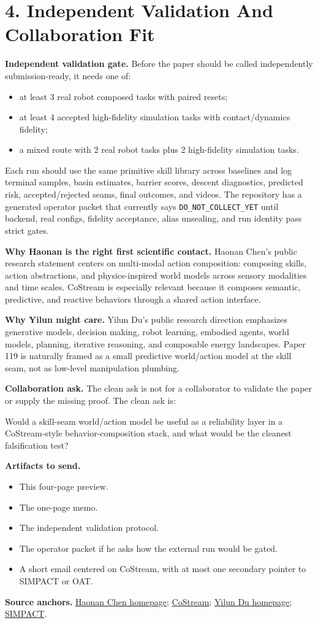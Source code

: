 \documentclass[10pt]{article}
\newcommand{\boxnote}[1]{\colorbox{soft}{\parbox{\dimexpr\linewidth-2\fboxsep}{#1}}}
\begin{document}
\newpage
\section*{4. Independent Validation And Collaboration Fit}

\textbf{Independent validation gate.}
Before the paper should be called independently submission-ready, it needs one of:
\begin{itemize}
\item at least 3 real robot composed tasks with paired resets;
\item at least 4 accepted high-fidelity simulation tasks with contact/dynamics fidelity;
\item a mixed route with 2 real robot tasks plus 2 high-fidelity simulation tasks.
\end{itemize}

Each run should use the same primitive skill library across baselines and log terminal samples, basin estimates, barrier scores, descent diagnostics, predicted risk, accepted/rejected seams, final outcomes, and videos. The repository has a generated operator packet that currently says \texttt{DO\_NOT\_COLLECT\_YET} until backend, real configs, fidelity acceptance, alias unsealing, and run identity pass strict gates.

\textbf{Why Haonan is the right first scientific contact.}
Haonan Chen's public research statement centers on multi-modal action composition: composing skills, action abstractions, and physics-inspired world models across sensory modalities and time scales. CoStream is especially relevant because it composes semantic, predictive, and reactive behaviors through a shared action interface.

\textbf{Why Yilun might care.}
Yilun Du's public research direction emphasizes generative models, decision making, robot learning, embodied agents, world models, planning, iterative reasoning, and composable energy landscapes. Paper 119 is naturally framed as a small predictive world/action model at the skill seam, not as low-level manipulation plumbing.

\textbf{Collaboration ask.}
The clean ask is not for a collaborator to validate the paper or supply the missing proof. The clean ask is:

\boxnote{Would a skill-seam world/action model be useful as a reliability layer in a CoStream-style behavior-composition stack, and what would be the cleanest falsification test?}

\textbf{Artifacts to send.}
\begin{itemize}
\item This four-page preview.
\item The one-page memo.
\item The independent validation protocol.
\item The operator packet if he asks how the external run would be gated.
\item A short email centered on CoStream, with at most one secondary pointer to SIMPACT or OAT.
\end{itemize}

\vfill
\textbf{Source anchors.}
\href{https://haonan16.github.io/}{Haonan Chen homepage};
\href{https://arxiv.org/abs/2606.26423}{CoStream};
\href{https://yilundu.github.io/}{Yilun Du homepage};
\href{https://arxiv.org/abs/2512.05955}{SIMPACT}.
\end{document}
